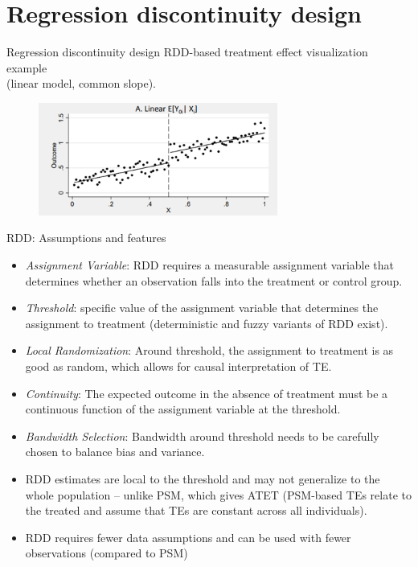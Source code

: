 \documentclass{beamer}
\begin{document}
\section{Regression discontinuity design}
\begin{frame}{Regression discontinuity design}
\centering
RDD-based treatment effect visualization example \\(linear model, common slope).

\begin{figure}
    \includegraphics[width=0.7\textwidth]{./IMG/RDD1.png}
    \label{fig:my_label}
\end{figure}    
\end{frame}
\begin{frame}{RDD: Assumptions and features}
 \footnotesize  
\begin{itemize}
    \item \emph{Assignment Variable}: RDD requires a measurable assignment variable that determines whether an observation falls into the treatment or control group.
    \item \emph{Threshold}: specific value of the assignment variable that determines the assignment to treatment (deterministic and fuzzy variants of RDD exist).
    \item \emph{Local Randomization}: Around threshold, the assignment to treatment is as good as random, which allows for causal interpretation of TE.
    \item \emph{Continuity}: The expected outcome in the absence of treatment must be a continuous function of the assignment variable at the threshold.
    \item \emph{Bandwidth Selection}: Bandwidth around threshold needs to be carefully chosen to balance bias and variance.
    \bigskip
    \item RDD estimates are local to the threshold and may not generalize to the whole population -- unlike PSM, which gives ATET (PSM-based TEs relate to the treated and assume that TEs are constant across all individuals).
    \item RDD requires fewer data assumptions and can be used with fewer observations (compared to PSM) 




\end{itemize}
    
\end{frame}
\end{document}
